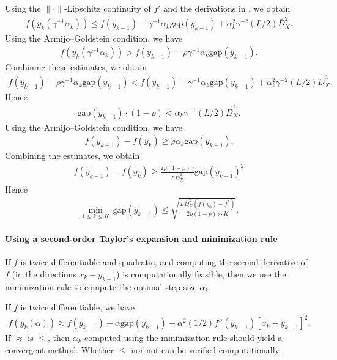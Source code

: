 \documentclass{scrartcl}
\begin{document}
	Using the $\|\cdot\|$-Lipschitz continuity of $f'$ and the derivations in 
	\cite[p.\ 469]{Lan2020}, we obtain
	\begin{align*}
		f(y_k(\gamma^{-1}\alpha_k)) \leq f(y_{k-1}) - 
		\gamma^{-1}\alpha_k \mathrm{gap}(y_{k-1})
		+ \alpha_k^2 \gamma^{-2} (L/2) \bar{D}_X^2.
	\end{align*}
	Using the Armijo--Goldstein condition, we have
	\begin{align*}
		f(y_k(\gamma^{-1}\alpha_k)) > f(y_{k-1}) - \rho \gamma^{-1}
		\alpha_k \mathrm{gap}(y_{k-1}).
	\end{align*}
	Combining these estimates, we obtain
	\begin{align*}
		f(y_{k-1}) - \rho \gamma^{-1}
		\alpha_k \mathrm{gap}(y_{k-1}) < 
		f(y_{k-1}) - 
		\gamma^{-1}\alpha_k \mathrm{gap}(y_{k-1})
		+ \alpha_k^2 \gamma^{-2} (L/2) \bar{D}_X^2.
	\end{align*}
	Hence
	\begin{align*}
		\mathrm{gap}(y_{k-1}) \cdot (1-\rho) < 
		\alpha_k\gamma^{-1} (L/2) \bar{D}_X^2.
	\end{align*}
	Using the Armijo--Goldstein condition, we have
	\begin{align*}
		f(y_{k-1}) - f(y_k) \geq  \rho \alpha_k \mathrm{gap}(y_{k-1}).
	\end{align*}
	Combining the estimates, we obtain
	\begin{align*}
		f(y_{k-1}) - f(y_k) \geq  
		\frac{2\rho(1-\rho)\gamma}{L\bar{D}_X^2}
		\mathrm{gap}(y_{k-1})^2
	\end{align*}
	Hence
	\begin{align*}
		\min_{1\leq k \leq K}\, \mathrm{gap}(y_{k-1}) 
		\leq 
		\sqrt{\frac{L\bar{D}_X^2(f(y_0)-f^*)}{2\rho(1-\rho)\gamma \cdot K}}.
	\end{align*}
	
	\paragraph{Using a second-order Taylor's expansion
	and minimization rule}
	
	If $f$ is twice differentiable and quadratic,
	and computing the second derivative of $f$
	(in the directions $x_k-y_{k-1}$)
	is computationally feasible, then we use the minimization rule to compute
	the optimal step size $\alpha_k$.

	If $f$ is twice differentiable, we have
	\begin{align*}
		f(y_k(\alpha)) \approx f(y_{k-1}) - \alpha \mathrm{gap}(y_{k-1})
		+ \alpha^2 (1/2) f''(y_{k-1})[x_k-y_{k-1}]^2.
	\end{align*}
	If $\approx$ is $\leq$, then $\alpha_k$ computed using 
	the minimization rule should yield a convergent method.
	Whether $\leq$ nor not can be verified computationally. 
	
\end{document}
